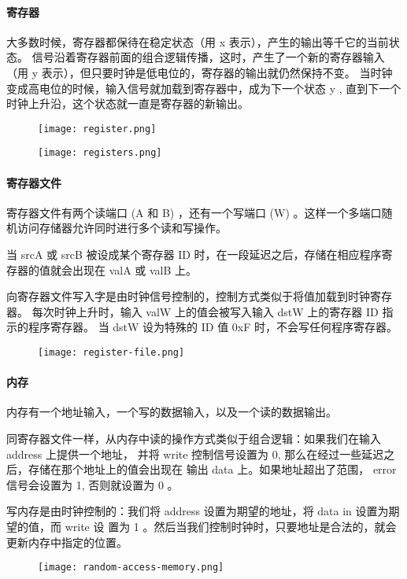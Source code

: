 \paragraph{寄存器}
大多数时候，寄存器都保待在稳定状态（用 x 表示），产生的输出等千它的当前状态。
信号沿着寄存器前面的组合逻辑传播，这时，产生了一个新的寄存器输入（用 y 表示），但只要时钟是低电位的，寄存器的输出就仍然保持不变。
当时钟变成高电位的时候，输入信号就加载到寄存器中，成为下一个状态 y , 直到下一个时钟上升沿，这个状态就一直是寄存器的新输出。
\begin{figure}[H]
    \centering
    \texttt{[image: register.png]}
\end{figure}
\begin{figure}[H]
    \centering
    \texttt{[image: registers.png]}
\end{figure}

\paragraph{寄存器文件}
寄存器文件有两个读端口 (A 和 B) ，还有一个写端口 (W) 。这样一个多端口随机访问存储器允许同时进行多个读和写操作。

当 srcA 或 srcB 被设成某个寄存器 ID 时，在一段延迟之后，存储在相应程序寄存器的值就会出现在 valA 或 valB 上。

向寄存器文件写入字是由时钟信号控制的，控制方式类似于将值加载到时钟寄存器。
每次时钟上升时，输入 valW 上的值会被写入输入 dstW 上的寄存器 ID 指示的程序寄存器。
当 dstW 设为特殊的 ID 值 0xF 时，不会写任何程序寄存器。
\begin{figure}[H]
    \centering
    \texttt{[image: register-file.png]}
\end{figure}

\paragraph{内存}

内存有一个地址输入，一个写的数据输入，以及一个读的数据输出。

同寄存器文件一样，从内存中读的操作方式类似于组合逻辑：如果我们在输入 address 上提供一个地址，
并将 write 控制信号设置为 0, 那么在经过一些延迟之后，存储在那个地址上的值会出现在
输出 data 上。如果地址超出了范围， error 信号会设置为 1, 否则就设置为 0 。

写内存是由时钟控制的：我们将 address 设置为期望的地址，将 data in 设置为期望的值，而 write 设
置为 1 。然后当我们控制时钟时，只要地址是合法的，就会更新内存中指定的位置。
\begin{figure}[H]
    \centering
    \texttt{[image: random-access-memory.png]}
\end{figure}

